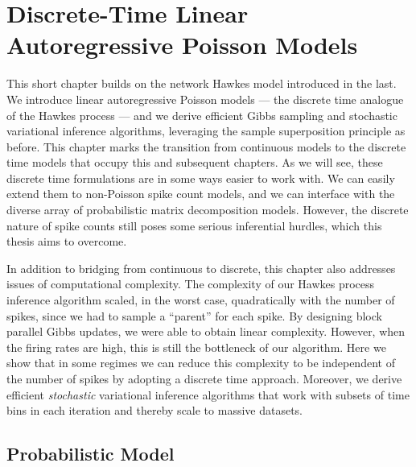 \chapter{Discrete-Time Linear Autoregressive Poisson Models}
\label{chap:four}

This short chapter builds on the network Hawkes model introduced in
the last. We introduce linear autoregressive Poisson models --- the discrete time analogue of the Hawkes process --- and we derive efficient Gibbs sampling
and stochastic variational inference algorithms, leveraging the sample
superposition principle as before. This chapter marks the transition
from continuous models to the discrete time models that occupy this
and subsequent chapters. As we will see, these discrete time formulations
are in some ways easier to work with. We can easily extend them to non-Poisson
spike count models, and we can interface with the diverse array of
probabilistic matrix decomposition models. However, the discrete
nature of spike counts still poses some serious inferential hurdles,
which this thesis aims to overcome.

In addition to bridging from continuous to discrete, this chapter also
addresses issues of computational complexity. The complexity of our Hawkes process
inference algorithm scaled, in the worst case, quadratically with the
number of spikes, since we had to sample a ``parent'' for each spike.
By designing block parallel Gibbs updates, we were able
to obtain linear complexity. However, when the firing rates are high,
this is still the bottleneck of our algorithm. Here we show that in
some regimes we can reduce this complexity to be independent
of the number of spikes by adopting a discrete time approach.
Moreover, we derive efficient \emph{stochastic} variational inference
algorithms that work with subsets of time bins in each iteration
and thereby scale to massive datasets.


\section{Probabilistic Model}

